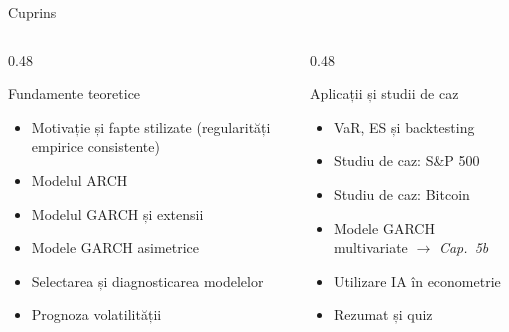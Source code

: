 \documentclass[9pt, aspectratio=169, t]{beamer}
\begin{document}
\begin{frame}{Cuprins}
    \small
    \vspace{-0.3cm}
    \begin{columns}[T]
        \begin{column}{0.48\textwidth}
            \begin{block}{Fundamente teoretice}
                \begin{itemize}\setlength{\itemsep}{2pt}
                    \item Motivație și fapte stilizate (regularități empirice consistente)
                    \item Modelul ARCH
                    \item Modelul GARCH și extensii
                    \item Modele GARCH asimetrice
                    \item Selectarea și diagnosticarea modelelor
                    \item Prognoza volatilității
                \end{itemize}
            \end{block}
        \end{column}
        \begin{column}{0.48\textwidth}
            \begin{exampleblock}{Aplicații și studii de caz}
                \begin{itemize}\setlength{\itemsep}{2pt}
                    \item VaR, ES și backtesting
                    \item Studiu de caz: S\&P 500
                    \item Studiu de caz: Bitcoin
                    \item Modele GARCH multivariate $\rightarrow$ \textit{Cap.\ 5b}
                    \item Utilizare IA în econometrie
                    \item Rezumat și quiz
                \end{itemize}
            \end{exampleblock}
        \end{column}
    \end{columns}
\end{frame}
\end{document}
